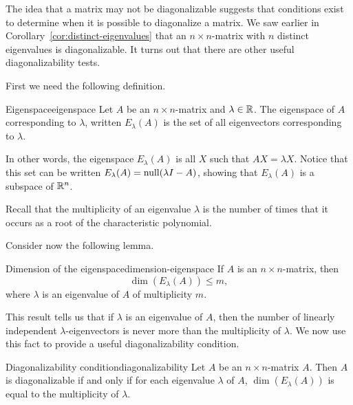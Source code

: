 The idea that a matrix may not be diagonalizable suggests that
conditions exist to determine when it is possible to diagonalize a
matrix. We saw earlier in Corollary~\ref{cor:distinct-eigenvalues}
that an $n \times n$-matrix with $n$ distinct eigenvalues is
diagonalizable. It turns out that there are other useful
diagonalizability tests.

First we need the following definition.

\begin{definition}{Eigenspace}{eigenspace}
  Let $A$ be an $n\times n$-matrix and $\lambda\in\mathbb{R}$.  The eigenspace
  of $A$ corresponding to $\lambda$, written $E_{\lambda}(A)$ is the
  set of all eigenvectors corresponding to $\lambda$.
\end{definition}

In other words, the eigenspace $E_{\lambda}(A)$ is all $X$ such that
$AX = \lambda X$. Notice that this set can be written
$E_{\lambda}(A) = \nullspace(\lambda I - A)$, showing that
$E_{\lambda}(A)$ is a subspace of $\mathbb{R}^n$.

Recall that the multiplicity of an eigenvalue $\lambda$ is the number
of times that it occurs as a root of the characteristic polynomial.

Consider now the following lemma.

\begin{lemma}{Dimension of the eigenspace}{dimension-eigenspace}
  If $A$ is an $n\times n$-matrix, then
  \begin{equation*}
    \dim(E_{\lambda}(A))\leq m,
  \end{equation*}
  where $\lambda$ is an eigenvalue of $A$ of multiplicity $m$.
\end{lemma}

This result tells us that if $\lambda$ is an eigenvalue of $A$, then
the number of linearly independent $\lambda$-eigenvectors is never
more than the multiplicity of $\lambda$. We now use this fact to
provide a useful diagonalizability condition.

\begin{theorem}{Diagonalizability condition}{diagonalizability}
  Let $A$ be an $n \times n$-matrix $A$. Then $A$ is diagonalizable if
  and only if for each eigenvalue $\lambda$ of $A$,
  $\dim(E_{\lambda}(A))$ is equal to the multiplicity of $\lambda$.
\end{theorem}

